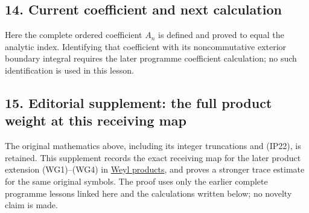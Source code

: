 \documentclass[
  11pt,
]{article}
\begin{document}
\subsection{14. Current coefficient and next
calculation}\label{current-coefficient-and-next-calculation}
\hypertarget{antecedent-and-next-coefficient}{}\label{antecedent-and-next-coefficient}

Here the complete ordered coefficient \(A_n\) is defined and proved to
equal the analytic index. Identifying that coefficient with its
noncommutative exterior boundary integral requires the later programme
coefficient calculation; no such identification is used in this lesson.

\subsection{15. Editorial supplement: the full product weight at this
receiving
map}\label{editorial-supplement-the-full-product-weight-at-this-receiving-map}

The original mathematics above, including its integer truncations and
(IP22), is retained. This supplement records the exact receiving map for
the later product extension (WG1)--(WG4) in
\href{weyl-metric-products.pdf}{Weyl products}, and proves a stronger
trace estimate for the same original symbols. The proof uses only the
earlier complete programme lessons linked here and the calculations
written below; no novelty claim is made.
\end{document}

